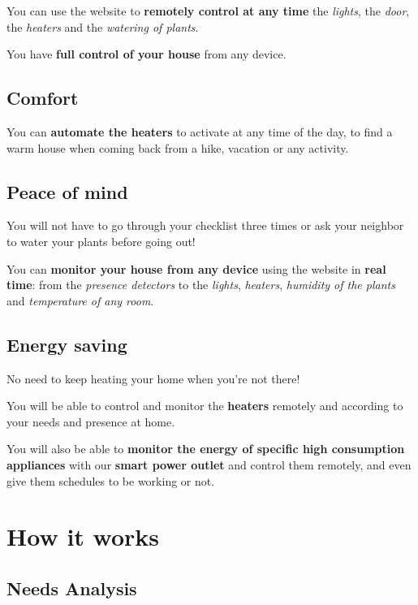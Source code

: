 \documentclass{report}
\begin{document}
You can use the website to \textbf{remotely control at any time} the \emph{lights}, the \emph{door}, the \emph{heaters} and the \emph{watering of plants}.

You have \textbf{full control of your house} from any device.

\section{Comfort}\label{sec:comfort}

You can \textbf{automate the heaters} to activate at any time of the day, to find a warm house when coming back from a hike, vacation or any activity.

\section{Peace of mind}\label{sec:peace-of-mind}

You will not have to go through your checklist three times or ask your neighbor to water your plants before going out!

You can \textbf{monitor your house from any device} using the website in \textbf{real time}: from the \emph{presence detectors} to the \emph{lights}, \emph{heaters}, \emph{humidity of the plants} and \emph{temperature of any room}.

\section{Energy saving}\label{sec:energy-saving}

No need to keep heating your home when you're not there!

You will be able to control and monitor the \textbf{heaters} remotely and according to your needs and presence at home.

You will also be able to \textbf{monitor the energy of specific high consumption appliances} with our \textbf{smart power outlet} and control them remotely, and even give them schedules to be working or not.

\chapter{How it works}\label{ch:how-it-works}

\section{Needs Analysis}\label{sec:needs-analysis}
\end{document}
